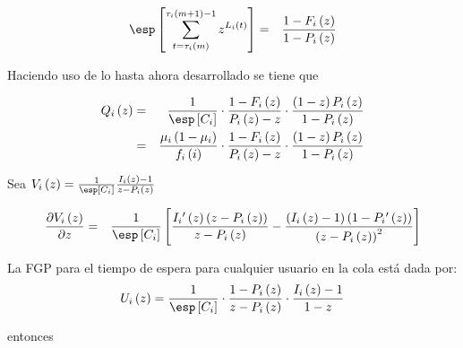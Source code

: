 \begin{eqnarray*}
\esp\left[\sum_{t=\tau_{i}\left(m\right)}^{\tau_{i}\left(m+1\right)-1}z^{L_{i}\left(t\right)}\right]&=&\frac{1-F_{i}\left(z\right)}{1-P_{i}\left(z\right)}
\end{eqnarray*}

Haciendo uso de lo hasta ahora desarrollado se tiene que

\begin{eqnarray*}
Q_{i}\left(z\right)&=&\frac{1}{\esp\left[C_{i}\right]}\cdot\frac{1-F_{i}\left(z\right)}{P_{i}\left(z\right)-z}\cdot\frac{\left(1-z\right)P_{i}\left(z\right)}{1-P_{i}\left(z\right)}\\
&=&\frac{\mu_{i}\left(1-\mu_{i}\right)}{f_{i}\left(i\right)}\cdot\frac{1-F_{i}\left(z\right)}{P_{i}\left(z\right)-z}\cdot\frac{\left(1-z\right)P_{i}\left(z\right)}{1-P_{i}\left(z\right)}
\end{eqnarray*}



Sea
$V_{i}\left(z\right)=\frac{1}{\esp\left[C_{i}\right]}\frac{I_{i}\left(z\right)-1}{z-P_{i}\left(z\right)}$


\begin{eqnarray*}
\frac{\partial V_{i}\left(z\right)}{\partial z}&=&\frac{1}{\esp\left[C_{i}\right]}\left[\frac{I_{i}{'}\left(z\right)\left(z-P_{i}\left(z\right)\right)}{z-P_{i}\left(z\right)}-\frac{\left(I_{i}\left(z\right)-1\right)\left(1-P_{i}{'}\left(z\right)\right)}{\left(z-P_{i}\left(z\right)\right)^{2}}\right]
\end{eqnarray*}


La FGP para el tiempo de espera para cualquier usuario en la cola est\'a dada por:
\[U_{i}\left(z\right)=\frac{1}{\esp\left[C_{i}\right]}\cdot\frac{1-P_{i}\left(z\right)}{z-P_{i}\left(z\right)}\cdot\frac{I_{i}\left(z\right)-1}{1-z}\]

entonces



